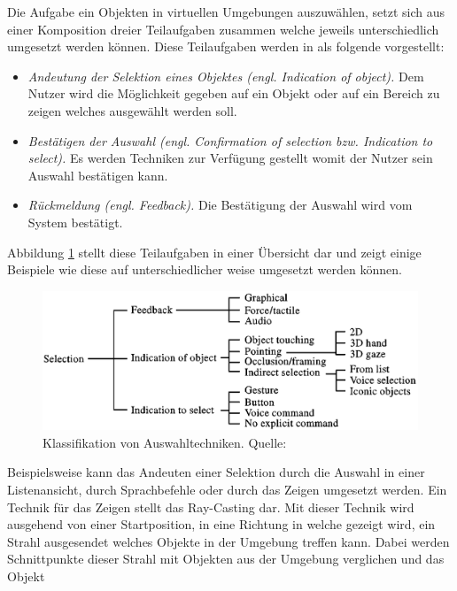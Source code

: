 Die Aufgabe ein Objekten in virtuellen Umgebungen auszuwählen, setzt sich aus einer Komposition dreier Teilaufgaben zusammen welche jeweils unterschiedlich umgesetzt werden können. 
Diese Teilaufgaben werden in \cite[S.~12]{Bowman1999} \cite[S.~150]{Bowman2011} als folgende vorgestellt: 

\begin{itemize}
\item \textit{Andeutung der Selektion eines Objektes (engl. Indication of object).} Dem Nutzer wird die Möglichkeit gegeben auf ein Objekt oder auf ein Bereich zu zeigen welches ausgewählt werden soll.
\item \textit{Bestätigen der Auswahl (engl. Confirmation of selection bzw. Indication to select).} Es werden Techniken zur Verfügung gestellt womit der Nutzer sein Auswahl bestätigen kann. 
\item \textit{Rückmeldung (engl. Feedback).} Die Bestätigung der Auswahl wird vom System bestätigt. 
\end{itemize}

Abbildung \ref{img:auswahluebersicht} stellt diese Teilaufgaben in einer Übersicht dar und zeigt einige Beispiele wie diese auf unterschiedlicher weise umgesetzt werden können. 

\begin{figure}[H]
	\centering 
	\includegraphics[width=.8\textwidth]{resources/analyse/Selection_uebersicht.png}
	\caption{Klassifikation von Auswahltechniken. Quelle: \cite[S.~12]{Bowman1999}}
	\label{img:auswahluebersicht}
\end{figure}

Beispielsweise kann das Andeuten einer Selektion durch die Auswahl in einer Listenansicht, durch Sprachbefehle oder durch das Zeigen umgesetzt werden. 
Ein Technik für das Zeigen stellt das Ray-Casting dar. Mit dieser Technik wird ausgehend von einer Startposition, in eine Richtung in welche gezeigt wird, ein Strahl 
ausgesendet welches Objekte in der Umgebung treffen kann. Dabei werden Schnittpunkte dieser Strahl mit Objekten aus der Umgebung verglichen und das Objekt    

